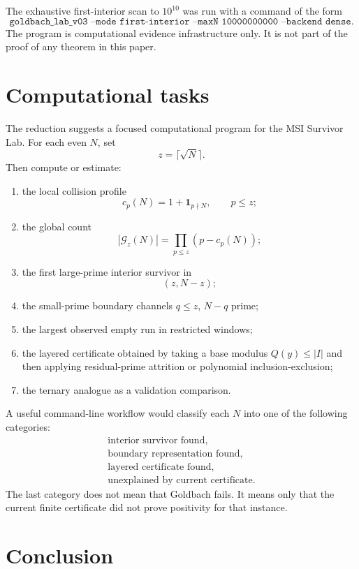 \documentclass[11pt]{article}
\theoremstyle{plain}
\theoremstyle{definition}
\theoremstyle{remark}
\newcommand{\G}{\mathcal G}
\newcommand{\one}{\mathbf 1}
\begin{document}
The exhaustive first-interior scan to \(10^{10}\) was run with a command of the form
\[
\texttt{goldbach\_lab\_v03 --mode first-interior --maxN 10000000000 --backend dense}.
\]
The program is computational evidence infrastructure only.  It is not part of
the proof of any theorem in this paper.

\section{Computational tasks}
\label{sec:computational}

The reduction suggests a focused computational program for the MSI Survivor Lab.
For each even \(N\), set
\[
z=\lceil\sqrt N\rceil.
\]
Then compute or estimate:
\begin{enumerate}[label=(\arabic*)]
\item the local collision profile
\[
c_p(N)=1+\one_{p\nmid N},
\qquad p\le z;
\]
\item the global count
\[
|\G_z(N)|=\prod_{p\le z}(p-c_p(N));
\]
\item the first large-prime interior survivor in
\[
(z,N-z);
\]
\item the small-prime boundary channels \(q\le z\), \(N-q\) prime;
\item the largest observed empty run in restricted windows;
\item the layered certificate obtained by taking a base modulus \(Q(y)\le |I|\)
and then applying residual-prime attrition or polynomial inclusion-exclusion;
\item the ternary analogue as a validation comparison.
\end{enumerate}

A useful command-line workflow would classify each \(N\) into one of the
following categories:
\[
\begin{array}{c}
\text{interior survivor found},\\
\text{boundary representation found},\\
\text{layered certificate found},\\
\text{unexplained by current certificate}.
\end{array}
\]
The last category does not mean that Goldbach fails.  It means only that the
current finite certificate did not prove positivity for that instance.

\section{Conclusion}
\end{document}
